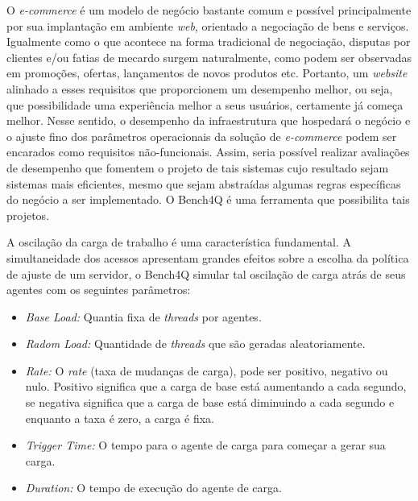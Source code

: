 O \textit{e-commerce} é um modelo de negócio bastante comum e possível principalmente por sua implantação em ambiente \textit{ web}, orientado a negociação de bens e serviços. Igualmente como o que acontece na forma tradicional de negociação, disputas por clientes e/ou fatias de mecardo surgem naturalmente, como podem ser observadas em promoções, ofertas, lançamentos de novos produtos etc. Portanto, um \textit{ website} alinhado a esses requisitos que proporcionem um desempenho melhor, ou seja, que possibilidade uma experiência melhor a seus usuários, certamente já começa melhor. Nesse sentido, o desempenho da infraestrutura que hospedará o negócio e o ajuste fino dos parâmetros operacionais da solução de \textit{ e-commerce} podem ser encarados como requisitos não-funcionais. Assim, seria possível realizar avaliações de desempenho que fomentem o projeto de tais sistemas cujo resultado sejam sistemas mais eficientes, mesmo que sejam abstraídas algumas regras específicas do negócio a ser implementado. O Bench4Q é uma ferramenta que possibilita tais projetos.

A oscilação da carga de trabalho é uma característica fundamental. A simultaneidade dos acessos apresentam grandes efeitos sobre a escolha da política de ajuste de um servidor, o Bench4Q simular tal oscilação de carga atrás de seus agentes com os seguintes parâmetros:

\begin{itemize}
	\item \textit{Base Load:} Quantia fixa de \textit{threads} por agentes.
	\item \textit{Radom Load:} Quantidade de \textit{threads} que são geradas aleatoriamente.
	\item \textit{Rate:} O \textit{rate} (taxa de mudanças de carga), pode ser positivo, negativo ou nulo. Positivo significa que a carga de base está aumentando a cada segundo, se negativa significa que a carga de base está diminuindo a cada segundo e enquanto a taxa é zero, a carga é fixa.
	\item \textit{Trigger Time:} O tempo para o agente de carga para começar a gerar sua carga.
	\item \textit{Duration:} O tempo de execução do agente de carga.
\end{itemize}

